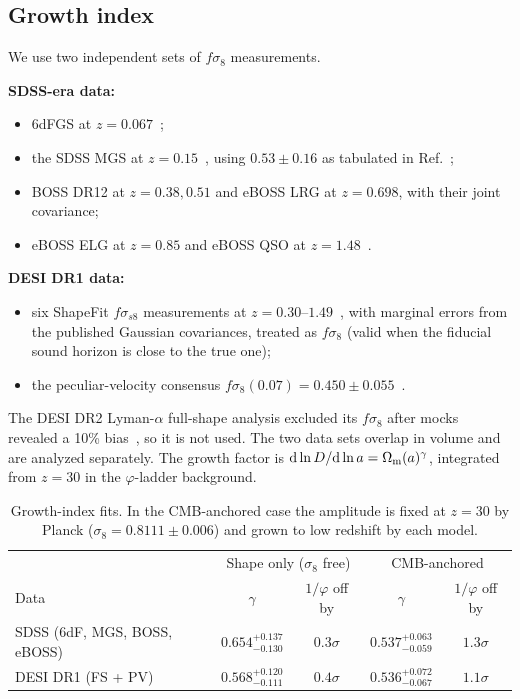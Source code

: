 \documentclass[11pt]{article}
\theoremstyle{definition}
\theoremstyle{remark}
\newcommand{\gr}{\varphi}
\newcommand{\Om}{\Omega_{\rm m}}
\begin{document}
\subsection{Growth index}\label{sec:growth}

We use two independent sets of $f\sigma_8$ measurements.

\textbf{SDSS-era data:}
\begin{itemize}
\item 6dFGS at $z = 0.067$~\cite{6dF};
\item the SDSS MGS at $z = 0.15$~\cite{MGS}, using $0.53 \pm 0.16$ as tabulated in Ref.~\cite{eBOSS};
\item BOSS DR12 at $z = 0.38, 0.51$ and eBOSS LRG at $z = 0.698$, with their joint covariance;
\item eBOSS ELG at $z = 0.85$ and eBOSS QSO at $z = 1.48$~\cite{eBOSS}.
\end{itemize}

\textbf{DESI DR1 data:}
\begin{itemize}
\item six ShapeFit $f\sigma_{s8}$ measurements at $z = 0.30$--$1.49$~\cite{DESI-FS}, with marginal errors from the published Gaussian covariances, treated as $f\sigma_8$ (valid when the fiducial sound horizon is close to the true one);
\item the peculiar-velocity consensus $f\sigma_8(0.07) = 0.450 \pm 0.055$~\cite{DESI-PV}.
\end{itemize}
The DESI DR2 Lyman-$\alpha$ full-shape analysis excluded its $f\sigma_8$ after mocks revealed a 10\% bias~\cite{LyaFS}, so it is not used. The two data sets overlap in volume and are analyzed separately. The growth factor is $\mathrm d\ln D/\mathrm d\ln a = \Om(a)^\gamma$, integrated from $z = 30$ in the $\gr$-ladder background.

\begin{table}[h]
\centering
\begin{tabular}{lcccc}
\toprule
 & \multicolumn{2}{c}{Shape only ($\sigma_8$ free)} & \multicolumn{2}{c}{CMB-anchored} \\
Data & $\gamma$ & $1/\gr$ off by & $\gamma$ & $1/\gr$ off by \\
\midrule
SDSS (6dF, MGS, BOSS, eBOSS) & $0.654^{+0.137}_{-0.130}$ & $0.3\sigma$ & $0.537^{+0.063}_{-0.059}$ & $1.3\sigma$ \\
DESI DR1 (FS + PV) & $0.568^{+0.120}_{-0.111}$ & $0.4\sigma$ & $0.536^{+0.072}_{-0.067}$ & $1.1\sigma$ \\
\bottomrule
\end{tabular}
\caption{Growth-index fits. In the CMB-anchored case the amplitude is fixed at $z = 30$ by Planck ($\sigma_8 = 0.8111 \pm 0.006$) and grown to low redshift by each model.}
\label{tab:growth}
\end{table}
\end{document}
